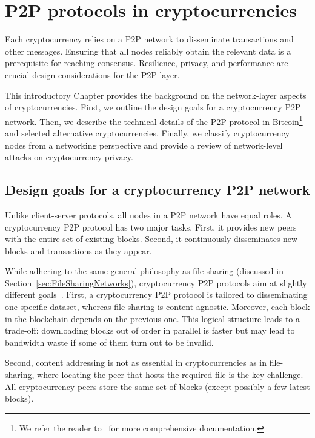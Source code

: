 \chapter{P2P protocols in cryptocurrencies}

\label{Chapter02IntroP2P}

Each cryptocurrency relies on a P2P network to disseminate transactions and other messages.
Ensuring that all nodes reliably obtain the relevant data is a prerequisite for reaching consensus.
Resilience, privacy, and performance are crucial design considerations for the P2P layer.

This introductory Chapter provides the background on the network-layer aspects of cryptocurrencies.
First, we outline the design goals for a cryptocurrency P2P network.
Then, we describe the technical details of the P2P protocol in Bitcoin\footnote{We refer the reader to~\cite{BitcoinWiki, Garay2015} for more comprehensive documentation.} and selected alternative cryptocurrencies.
Finally, we classify cryptocurrency nodes from a networking perspective and provide a review of network-level attacks on cryptocurrency privacy.


\section{Design goals for a cryptocurrency P2P network}

Unlike client-server protocols, all nodes in a P2P network have equal roles.
A cryptocurrency P2P protocol has two major tasks.
First, it provides new peers with the entire set of existing blocks.
Second, it continuously disseminates new blocks and transactions as they appear.

While adhering to the same general philosophy as file-sharing (discussed in Section~\ref{sec:FileSharingNetworks}), cryptocurrency P2P protocols aim at slightly different goals~\cite{Dotan2020}.
First, a cryptocurrency P2P protocol is tailored to disseminating one specific dataset, whereas file-sharing is content-agnostic.
Moreover, each block in the blockchain depends on the previous one.
This logical structure leads to a trade-off: downloading blocks out of order in parallel is faster but may lead to bandwidth waste if some of them turn out to be invalid.

Second, content addressing is not as essential in cryptocurrencies as in file-sharing, where locating the peer that hosts the required file is the key challenge.
All cryptocurrency peers store the same set of blocks (except possibly a few latest blocks).

